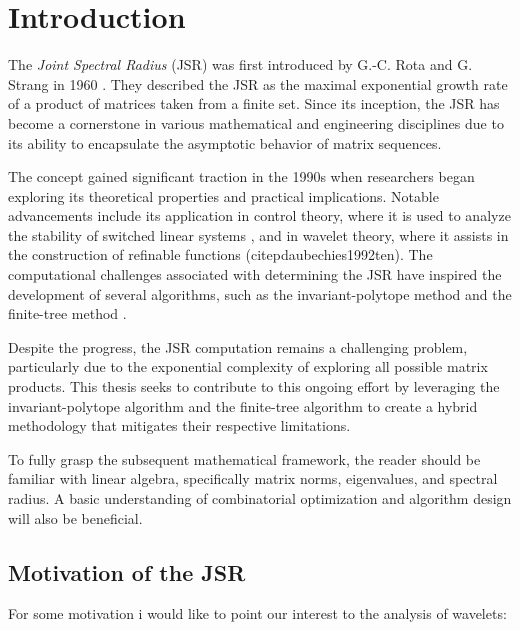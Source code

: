 
\chapter{Introduction}
\label{ch:introduction} %

The \textit{Joint Spectral Radius} (JSR) was first introduced by G.-C. Rota and G. Strang in 1960 \citep{rotaNoteJointSpectral1960}. They described the JSR as the maximal exponential growth rate of a product of matrices taken from a finite set. Since its inception, the JSR has become a cornerstone in various mathematical and engineering disciplines due to its ability to encapsulate the asymptotic behavior of matrix sequences. 

The concept gained significant traction in the 1990s when researchers began exploring its theoretical properties and practical implications. Notable advancements include its application in control theory, where it is used to analyze the stability of switched linear systems \citep{blondelSurveyComputationalComplexity2000}, and in wavelet theory, where it assists in the construction of refinable functions (citep{daubechies1992ten}). The computational challenges associated with determining the JSR have inspired the development of several algorithms, such as the invariant-polytope method \citep{guglielmiExactComputationJoint2013} and the finite-tree method \citep{jungersJointSpectralRadius2009}.

Despite the progress, the JSR computation remains a challenging problem, particularly due to the exponential complexity of exploring all possible matrix products. This thesis seeks to contribute to this ongoing effort by leveraging the invariant-polytope algorithm and the finite-tree algorithm to create a hybrid methodology that mitigates their respective limitations.

To fully grasp the subsequent mathematical framework, the reader should be familiar with linear algebra, specifically matrix norms, eigenvalues, and spectral radius. A basic understanding of combinatorial optimization and algorithm design will also be beneficial.

\section{Motivation of the JSR}
For some motivation i would like to point our interest to the analysis of wavelets:

